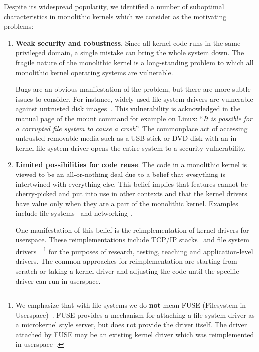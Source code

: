 Despite its widespread popularity, we identified a number of
suboptimal characteristics in monolithic kernels which we consider
as the motivating problems:

\begin{enumerate}
\item   \textbf{Weak security and robustness}.
	Since all kernel code runs in the same privileged domain, a
	single mistake can bring the whole system down.  The fragile
	nature of the monolithic kernel is a long-standing problem to
	which all monolithic kernel operating systems are vulnerable.

	Bugs are an obvious manifestation of the problem,
	but there are more subtle issues to consider.  For instance,
	widely used file system drivers are vulnerable against
	untrusted disk images~\cite{yang:exe}.	This vulnerability is
	acknowledged in the manual page of the mount command for example
	on Linux: ``\textit{It is possible for a corrupted file system
	to cause a crash}''.
	The commonplace act of accessing untrusted removable media such
	as a USB stick or DVD disk with an in-kernel file system driver
	opens the entire system to a security vulnerability.

\item	\textbf{Limited possibilities for code reuse}. The code in a
	monolithic kernel is viewed
	to be an all-or-nothing deal due to a belief that
	everything is intertwined with everything else.
	This belief implies
	that features cannot be cherry-picked and put into use in other
	contexts and that the kernel drivers have value only when they
	are a part of the monolithic kernel.
	Examples include file systems~\cite{yang:exe} and
	networking~\cite{musuvathi:netmodelcheck}.

	One manifestation of this belief is the reimplementation
	of kernel drivers for userspace.  These reimplementations include TCP/IP
	stacks~\cite{dinda:minet,pradhan:daytona} and file system
	drivers~\cite{e2fsprogs, mtools, sun:testfs}~\footnote
	{
		We emphasize that with file systems we do
		\textbf{not} mean FUSE (Filesystem in
		Userspace)~\cite{fuse}.  FUSE provides a mechanism
		for attaching a file system driver as a microkernel
		style server, but does not provide the driver
		itself.  The driver attached by FUSE may be an
		existing kernel driver which was reimplemented in
		userspace~\cite{e2fsprogs, fuseext2}.
	}
	for the purposes of research, testing, teaching and
	application-level drivers.  The common approaches for reimplementation
	are starting from scratch or taking a kernel driver and
	adjusting the code until the specific driver can run in
	userspace.


\end{enumerate}
